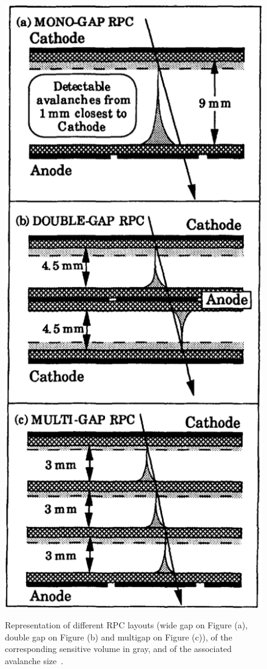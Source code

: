 	\begin{figure}[H]
		\centering
		\includegraphics[width = 0.5\plotwidth]{fig/chapt4/RPC-layouts-dyn-range.png}\\
		\caption{\label{fig:RPClayouts} Representation of different RPC layouts (wide gap on Figure (a), double gap on Figure (b) and multigap on Figure (c)), of the corresponding sensitive volume in gray, and of the associated avalanche size~\cite{WILLIAMS98}.}
	\end{figure}
	
